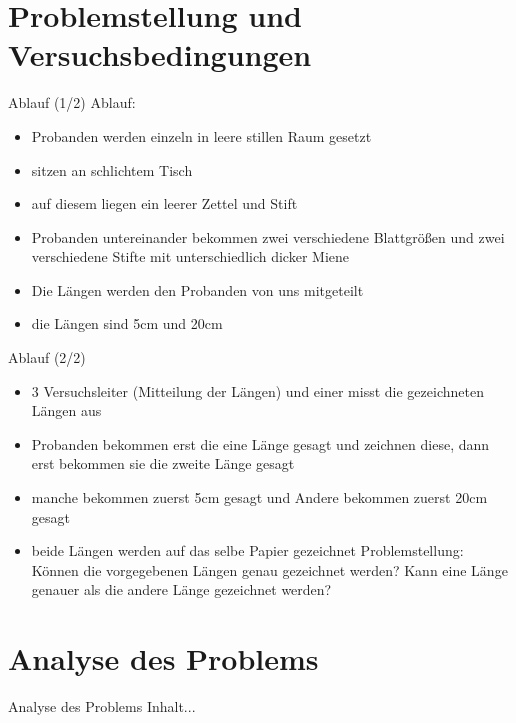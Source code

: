 \documentclass[ ngerman, fontsize= 10pt, headings=big, titlepage=true]{beamer}
\begin{document}
\section{Problemstellung und Versuchsbedingungen}
\begin{frame}{Ablauf (1/2)}
Ablauf:
\begin{itemize}
\item Probanden werden einzeln in leere stillen Raum gesetzt
\item sitzen an schlichtem Tisch 
\item auf diesem liegen ein leerer Zettel und Stift
\item Probanden untereinander bekommen zwei verschiedene Blattgrößen und zwei verschiedene Stifte mit unterschiedlich dicker Miene
\item Die Längen werden den Probanden von uns mitgeteilt
\item die Längen sind 5cm und 20cm




\end{itemize}
	
\end{frame}
\begin{frame}{Ablauf (2/2)}
\begin{itemize}

\item 3 Versuchsleiter (Mitteilung der Längen) und einer misst die gezeichneten Längen aus
\item Probanden bekommen erst die eine Länge gesagt und zeichnen diese, dann erst bekommen sie die zweite Länge gesagt
\item manche bekommen zuerst 5cm gesagt und Andere bekommen zuerst 20cm gesagt
\item beide Längen werden auf das selbe Papier gezeichnet \newline
Problemstellung:\newline
Können die vorgegebenen Längen genau gezeichnet werden?
Kann eine Länge genauer als die andere Länge gezeichnet werden?
\end{itemize}
\end{frame}

\section{Analyse des Problems}
\begin{frame}{Analyse des Problems}
	Inhalt...
\end{frame}
\end{document}
